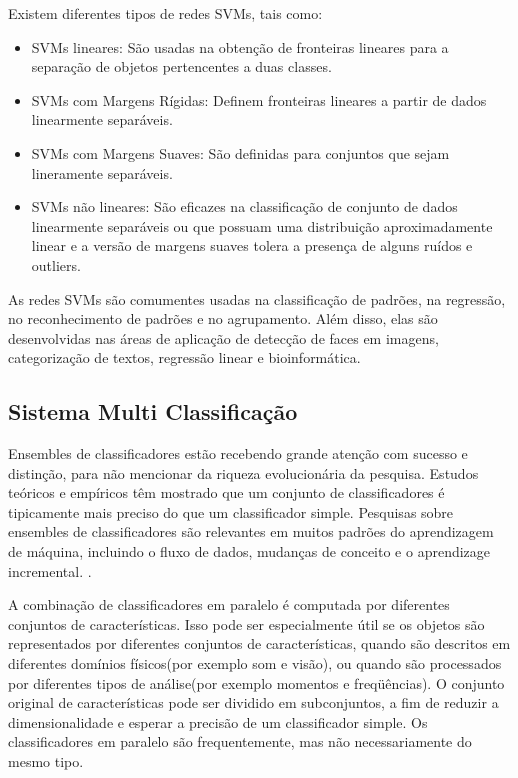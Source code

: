 \documentclass[12pt]{article}
\begin{document}
Existem diferentes tipos de redes SVMs, tais como:
\begin{itemize}
    \item SVMs lineares: São usadas na obtenção de fronteiras lineares para a separação de objetos pertencentes a duas classes.
    \item SVMs com Margens Rígidas: Definem fronteiras lineares a partir de dados linearmente separáveis.
    \item  SVMs com Margens Suaves: São definidas para conjuntos que sejam lineramente separáveis.
    \item SVMs não lineares: São eficazes na classificação de conjunto de dados linearmente separáveis ou que possuam uma distribuição aproximadamente linear e a versão de margens suaves tolera a presença de alguns ruídos e outliers.
\end{itemize}

As redes SVMs são comumentes usadas na classificação de padrões, na regressão, no reconhecimento de padrões e no agrupamento. Além disso, elas são desenvolvidas nas áreas de aplicação de detecção de faces em imagens, categorização de textos, regressão linear e bioinformática.



\subsection{Sistema Multi Classificação}

Ensembles de classificadores estão recebendo grande atenção com sucesso e distinção, para não mencionar da riqueza evolucionária da pesquisa. Estudos teóricos e empíricos têm mostrado que um conjunto de classificadores é tipicamente mais preciso do que um classificador simple. Pesquisas sobre ensembles de classificadores são relevantes em muitos padrões do aprendizagem de máquina, incluindo o fluxo de dados, mudanças de conceito e o aprendizage incremental. \cite{elwell2011incremental}.

A combinação de classificadores em paralelo é computada por diferentes conjuntos de características. Isso pode ser especialmente útil se os objetos são representados por diferentes conjuntos de características, quando são descritos em diferentes domínios físicos(por exemplo som e visão), ou quando são processados por diferentes tipos de análise(por exemplo momentos e freqüências). O conjunto original de características pode ser dividido em subconjuntos, a fim de reduzir a dimensionalidade e esperar a precisão de um classificador simple. Os classificadores em paralelo são frequentemente, mas não necessariamente do mesmo tipo.
\end{document}
